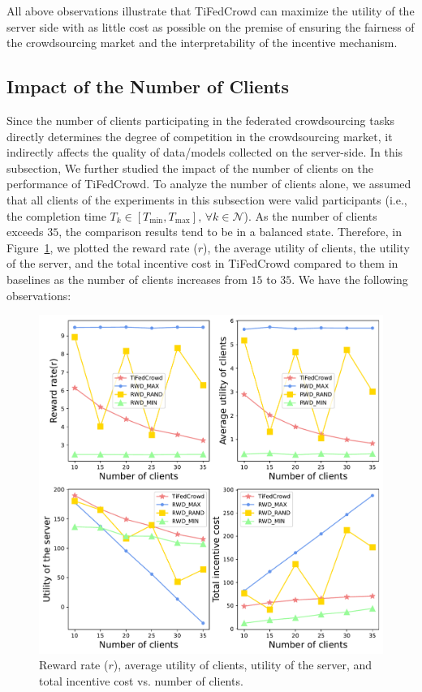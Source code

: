 \documentclass[final,1p,times]{elsarticle}
\begin{document}
All above observations illustrate that TiFedCrowd can maximize the utility of the server side with as little cost as possible on the premise of ensuring the fairness of the crowdsourcing market and the interpretability of the incentive mechanism.

\subsection{Impact of the Number of Clients}\label{ITNC}
Since the number of clients participating in the federated crowdsourcing tasks directly determines the degree of competition in the crowdsourcing market, it indirectly affects the quality of data/models collected on the server-side. In this subsection, We further studied the impact of the number of clients on the performance of TiFedCrowd. To analyze the number of clients alone, we assumed that all clients of the experiments in this subsection were valid participants (i.e., the completion time $T_k\in[T_{\min},T_{\max}],\,\forall k\in\bm{\mathcal{N}}$). As the number of clients exceeds $35$, the comparison results tend to be in a balanced state. Therefore, in Figure~\ref{fig:4}, we plotted the reward rate ($r$), the average utility of clients, the utility of the server, and the total incentive cost in TiFedCrowd compared to them in baselines as the number of clients increases from $15$ to $35$. We have the following observations:

\begin{figure}
	\centering
	\centerline{\includegraphics[width=5.5in]{fig4.pdf}}
	\caption{Reward rate ($r$), average utility of clients, utility of the server, and total incentive cost vs. number of clients.}
	\label{fig:4}
\end{figure}
\end{document}
